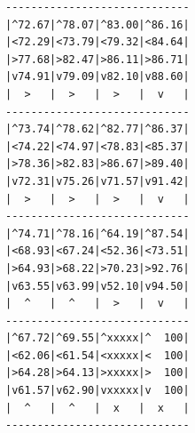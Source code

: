 \documentclass[12pt,a4paper]{article} %
\begin{document}
\begin{lstlisting}[float,floatplacement=H,caption={Q-learning: 1 000 000 iterations, $\epsilon$: 0.05}]
-----------------------------
|^72.67|^78.07|^83.00|^86.16|
|<72.29|<73.79|<79.32|<84.64|
|>77.68|>82.47|>86.11|>86.71|
|v74.91|v79.09|v82.10|v88.60|
|  >   |  >   |  >   |  v   |
-----------------------------
|^73.74|^78.62|^82.77|^86.37|
|<74.22|<74.97|<78.83|<85.37|
|>78.36|>82.83|>86.67|>89.40|
|v72.31|v75.26|v71.57|v91.42|
|  >   |  >   |  >   |  v   |
-----------------------------
|^74.71|^78.16|^64.19|^87.54|
|<68.93|<67.24|<52.36|<73.51|
|>64.93|>68.22|>70.23|>92.76|
|v63.55|v63.99|v52.10|v94.50|
|  ^   |  ^   |  >   |  v   |
-----------------------------
|^67.72|^69.55|^xxxxx|^  100|
|<62.06|<61.54|<xxxxx|<  100|
|>64.28|>64.13|>xxxxx|>  100|
|v61.57|v62.90|vxxxxx|v  100|
|  ^   |  ^   |  x   |  x   |
-----------------------------
\end{lstlisting}
\end{document}
